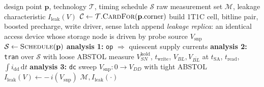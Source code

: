 \begin{algorithm}[!t]
\caption{SPICE characterisation of one DRAM design point}
\label{alg:spice_characterisation_of_one_dram_design_point}
\begin{algorithmic}[1]
\Require design point $\mathbf{p}$, technology $\mathcal{T}$, timing schedule $\mathcal{S}$
\Ensure raw measurement set $\mathcal{M}$, leakage characteristic $I_{\mathrm{leak}}(V)$
    \State $\mathcal{C} \leftarrow \mathcal{T}.\textsc{CardFor}(\mathbf{p}.\text{corner})$
    \State build 1T1C cell, bitline pair, boosted precharge, write driver, sense latch
    \State append \emph{leakage replica}: an identical access device whose storage node is driven by probe source $V_{\mathrm{snp}}$
    \State $\mathcal{S} \leftarrow \textsc{Schedule}(\mathbf{p})$
    \textbf{analysis 1:} \texttt{op} $\Rightarrow$ quiescent supply currents
    \textbf{analysis 2:} \texttt{tran} over $\mathcal{S}$ with loose ABSTOL
        \State measure $V_{SN}^{\mathrm{hold}}$, $t_{\mathrm{write}}$, $V_{BL},V_{\overline{BL}}$ at $t_{\mathrm{SA}}$, $t_{\mathrm{read}}$, $\int i_{\mathrm{dd}}\,\mathrm{d}t$
    \textbf{analysis 3:} \texttt{dc} sweep $V_{\mathrm{snp}}: 0 \to V_{DD}$ with tight ABSTOL
        \State $I_{\mathrm{leak}}(V) \leftarrow -\,i(V_{\mathrm{snp}})$
    \Return $\mathcal{M}, I_{\mathrm{leak}}(\cdot)$
\end{algorithmic}
\end{algorithm}
